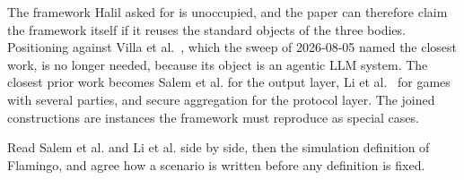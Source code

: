 \documentclass{labreport}
\begin{document}





\lrchanges
The framework Halil asked for is unoccupied, and the paper can therefore claim the framework itself if it reuses the standard objects of the three bodies.
Positioning against Villa et al.~\cite{VDKMR26}, which the sweep of 2026-08-05 named the closest work, is no longer needed, because its object is an agentic LLM system.
The closest prior work becomes Salem et al. for the output layer, Li et al.~\cite{LLLKPMW24} for games with several parties, and secure aggregation for the protocol layer.
The  joined constructions are instances the framework must reproduce as special cases.

\lrnext
Read Salem et al. and Li et al. side by side, then the simulation definition of Flamingo, and agree how a scenario is written before any definition is fixed.

\clearpage
\lrreferences
\end{document}
